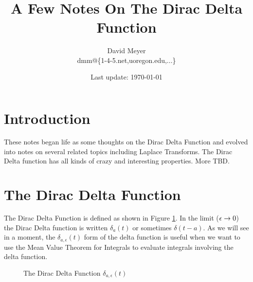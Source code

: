 \documentclass{article}
\title{A Few Notes On The Dirac Delta Function}
\author{David Meyer \\ dmm@\{1-4-5.net,uoregon.edu,...\}}
\date{Last update: \today}							%
\begin{document}
\maketitle

\section{Introduction}
These notes began life as some thoughts on the Dirac Delta Function and evolved into notes on several related topics including  Laplace Transforms. The 
Dirac Delta function has all kinds of crazy and interesting properties. More TBD.

\section{The Dirac Delta Function}
The Dirac Delta Function is defined as shown in Figure \ref{fig:delta}. In the limit ($\mathlarger{\epsilon} \to 0$) the
 Dirac Delta function is written $\delta_a(t)$ or sometimes $\delta(t - a)$. As we will see in a moment, the $\delta_{a,\epsilon}(t)$ form of the delta function
 is useful when we want to use the Mean Value Theorem for Integrals \cite{wiki:meam_value_theorem_for_integrals} to evaluate integrals involving the delta function.
 
\bigskip

\begin{figure}[H]
  \centering
  \caption{The Dirac Delta Function $\delta_{a,\epsilon}(t)$}
  \label{fig:delta}
\end{figure}
\end{document}
